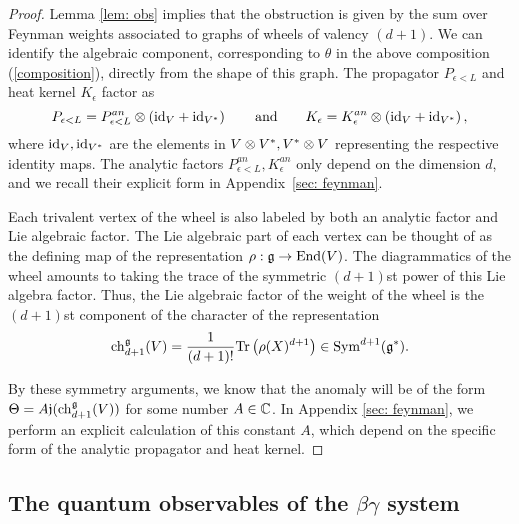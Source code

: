 \begin{proof}
Lemma \ref{lem: obs} implies that the obstruction is given by the sum over Feynman weights associated to graphs of wheels of valency $(d+1)$.
We can identify the algebraic component, corresponding to $\theta$ in the above composition (\ref{composition}), directly from the shape of this graph. 
The propagator $P_{\epsilon<L}$ and heat kernel $K_\epsilon$ factor as
\[
P_{\epsilon<L} = P^{an}_{\epsilon<L} \otimes \left({\rm id}_{V} + {\rm id}_{V^*}\right)
\quad\quad\text{and}\quad\quad 
K_{\epsilon} = K_{\epsilon}^{an} \otimes \left({\rm id}_{V} + {\rm id}_{V^*}\right),
\]
where ${\rm id}_V, {\rm id}_{V^*}$ are the elements in $V \otimes V^*, V^* \otimes V$ representing the respective identity maps. 
The analytic factors $P^{an}_{\epsilon<L},  K_{\epsilon}^{an}$ only depend on the dimension $d$, and we recall their explicit form in Appendix~\ref{sec: feynman}. 

Each trivalent vertex of the wheel is also labeled by both an analytic factor and Lie algebraic factor. 
The Lie algebraic part of each vertex can be thought of as the defining map of the representation $\rho : \mathfrak g \to {\rm End}(V)$. 
The diagrammatics of the wheel amounts to taking the trace of the symmetric $(d+1)$st power of this Lie algebra factor. 
Thus, the Lie algebraic factor of the weight of the wheel is the $(d+1)$st component of the character of the representation
\[
{\rm ch}_{d+1}^\mathfrak g(V) = \frac{1}{(d+1)!} {\rm Tr}\left(\rho(X)^{d+1}\right) \in {\rm Sym}^{d+1}(\mathfrak g^*) .
\]

By these symmetry arguments, we know that the anomaly will be of the form $\Theta = A \mathfrak j ({\rm ch}_{d+1}^{\mathfrak g}(V))$ for some number $A \in \mathbb C$.
In Appendix \ref{sec: feynman}, we perform an explicit calculation of this constant $A$, which depend on the specific form of the analytic propagator and heat kernel. 
\end{proof}


\subsection{The quantum observables of the $\beta\gamma$ system}

